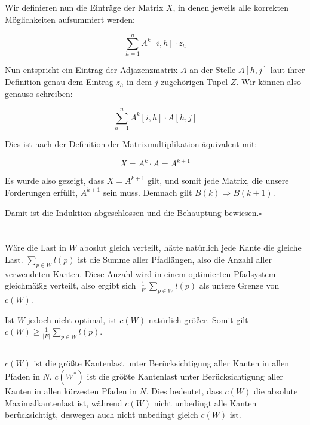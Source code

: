 \documentclass[10pt,a4paper,oneside,ngerman,numbers=noenddot]{scrartcl}
\begin{document}
	    Wir definieren nun die Einträge der Matrix $X$, in denen jeweils alle korrekten Möglichkeiten aufsummiert werden:

	    $$\sum_{h=1}^{n}{A^k[i,h] \cdot z_h} $$

	    Nun entspricht ein Eintrag der Adjazenzmatrix $A$ an der Stelle $A[h,j]$ laut ihrer Definition genau dem Eintrag $z_h$ in dem $j$ zugehörigen Tupel $Z$.
	    Wir können also genauso schreiben:

	    $$ \sum_{h=1}^{n}{A^k[i,h] \cdot A[h,j]}$$

	    Dies ist nach der Definition der Matrixmultiplikation äquivalent mit:

	    $$ X = A^k \cdot A = A^{k+1} $$

	    Es wurde also gezeigt, dass $X = A^{k+1}$ gilt, und somit jede Matrix, die unsere Forderungen erfüllt, $A^{k+1}$ sein muss.
	    Demnach gilt $B(k) \Rightarrow B(k+1)$.

	    Damit ist die Induktion abgeschlossen und die Behauptung bewiesen.$\square$
	\subsection{} %
	\subsection{} %
\section{} %
	\subsection{} %
		Wäre die Last in $W$ aboslut gleich verteilt, hätte natürlich jede Kante die gleiche Last.
		$ \sum_{p \in W} l(p) $ ist die Summe aller Pfadlängen, also die Anzahl aller verwendeten Kanten.
		Diese Anzahl wird in einem optimierten Pfadsystem gleichmäßig verteilt, also ergibt sich
		$ \frac{1}{|E|} \sum_{p \in W} l(p) $ als untere Grenze von $ c(W) $.

		Ist $ W $ jedoch nicht optimal, ist $ c(W) $ natürlich größer. Somit gilt
		$ c(W) \ge \frac{1}{|E|} \sum_{p \in W} l(p) $.
	\newpage
	\subsection{} %
		$ c(W) $ ist die größte Kantenlast unter Berücksichtigung aller Kanten in allen Pfaden in $N$. $ c(W^*) $ ist die größte Kantenlast
		unter Berücksichtigung aller Kanten in allen kürzesten Pfaden in $N$. Dies bedeutet, dass $ c(W) $ die absolute Maximalkantenlast ist,
		während $ c(W) $ nicht unbedingt alle Kanten berücksichtigt, deswegen auch nicht unbedingt gleich $ c(W) $ ist.
\end{document}
